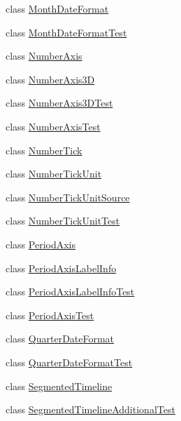 \begin{DoxyCompactItemize}
class \mbox{\hyperlink{classorg_1_1jfree_1_1chart_1_1axis_1_1_month_date_format}{Month\+Date\+Format}}
\item 
class \mbox{\hyperlink{classorg_1_1jfree_1_1chart_1_1axis_1_1_month_date_format_test}{Month\+Date\+Format\+Test}}
\item 
class \mbox{\hyperlink{classorg_1_1jfree_1_1chart_1_1axis_1_1_number_axis}{Number\+Axis}}
\item 
class \mbox{\hyperlink{classorg_1_1jfree_1_1chart_1_1axis_1_1_number_axis3_d}{Number\+Axis3D}}
\item 
class \mbox{\hyperlink{classorg_1_1jfree_1_1chart_1_1axis_1_1_number_axis3_d_test}{Number\+Axis3\+D\+Test}}
\item 
class \mbox{\hyperlink{classorg_1_1jfree_1_1chart_1_1axis_1_1_number_axis_test}{Number\+Axis\+Test}}
\item 
class \mbox{\hyperlink{classorg_1_1jfree_1_1chart_1_1axis_1_1_number_tick}{Number\+Tick}}
\item 
class \mbox{\hyperlink{classorg_1_1jfree_1_1chart_1_1axis_1_1_number_tick_unit}{Number\+Tick\+Unit}}
\item 
class \mbox{\hyperlink{classorg_1_1jfree_1_1chart_1_1axis_1_1_number_tick_unit_source}{Number\+Tick\+Unit\+Source}}
\item 
class \mbox{\hyperlink{classorg_1_1jfree_1_1chart_1_1axis_1_1_number_tick_unit_test}{Number\+Tick\+Unit\+Test}}
\item 
class \mbox{\hyperlink{classorg_1_1jfree_1_1chart_1_1axis_1_1_period_axis}{Period\+Axis}}
\item 
class \mbox{\hyperlink{classorg_1_1jfree_1_1chart_1_1axis_1_1_period_axis_label_info}{Period\+Axis\+Label\+Info}}
\item 
class \mbox{\hyperlink{classorg_1_1jfree_1_1chart_1_1axis_1_1_period_axis_label_info_test}{Period\+Axis\+Label\+Info\+Test}}
\item 
class \mbox{\hyperlink{classorg_1_1jfree_1_1chart_1_1axis_1_1_period_axis_test}{Period\+Axis\+Test}}
\item 
class \mbox{\hyperlink{classorg_1_1jfree_1_1chart_1_1axis_1_1_quarter_date_format}{Quarter\+Date\+Format}}
\item 
class \mbox{\hyperlink{classorg_1_1jfree_1_1chart_1_1axis_1_1_quarter_date_format_test}{Quarter\+Date\+Format\+Test}}
\item 
class \mbox{\hyperlink{classorg_1_1jfree_1_1chart_1_1axis_1_1_segmented_timeline}{Segmented\+Timeline}}
\item 
class \mbox{\hyperlink{classorg_1_1jfree_1_1chart_1_1axis_1_1_segmented_timeline_additional_test}{Segmented\+Timeline\+Additional\+Test}}

\end{DoxyCompactItemize}
